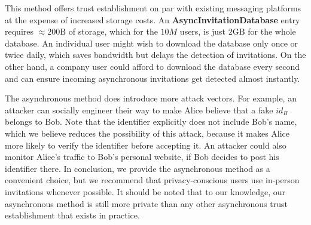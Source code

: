 This method offers trust establishment on par with existing messaging platforms at the expense of increased storage costs. An \textbf{AsyncInvitationDatabase} entry requires $\approx200\text{B}$ of storage, which for the $10M$ users, is just $2\text{GB}$ for the whole database. An individual user might wish to download the database only once or twice daily, which saves bandwidth but delays the detection of invitations. On the other hand, a company user could afford to download the database every second and can ensure incoming asynchronous invitations get detected almost instantly.

The asynchronous method does introduce more attack vectors. For example, an attacker can socially engineer their way to make Alice believe that a fake $id_B$ belongs to Bob. Note that the identifier explicitly does not include Bob's name, which we believe reduces the possibility of this attack, because it makes Alice more likely to verify the identifier before accepting it. An attacker could also monitor Alice's traffic to Bob's personal website, if Bob decides to post his identifier there. In conclusion, we provide the asynchronous method as a convenient choice, but we recommend that privacy-conscious users use in-person invitations whenever possible. It should be noted that to our knowledge, our asynchronous method is still more private than any other asynchronous trust establishment that exists in practice.